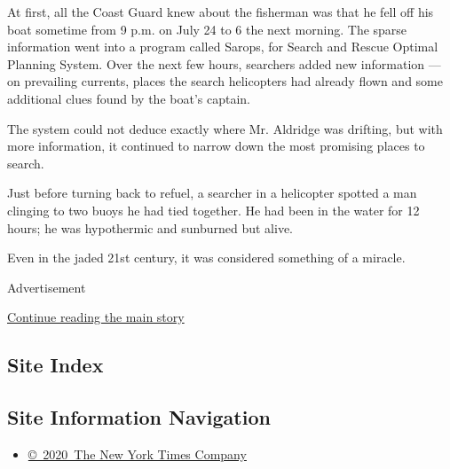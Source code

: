 At first, all the Coast Guard knew about the fisherman was that he fell
off his boat sometime from 9 p.m. on July 24 to 6 the next morning. The
sparse information went into a program called Sarops, for Search and
Rescue Optimal Planning System. Over the next few hours, searchers added
new information --- on prevailing currents, places the search
helicopters had already flown and some additional clues found by the
boat's captain.

The system could not deduce exactly where Mr. Aldridge was drifting, but
with more information, it continued to narrow down the most promising
places to search.

Just before turning back to refuel, a searcher in a helicopter spotted a
man clinging to two buoys he had tied together. He had been in the water
for 12 hours; he was hypothermic and sunburned but alive.

Even in the jaded 21st century, it was considered something of a
miracle.

Advertisement

\protect\hyperlink{after-bottom}{Continue reading the main story}

\hypertarget{site-index}{%
\subsection{Site Index}\label{site-index}}

\hypertarget{site-information-navigation}{%
\subsection{Site Information
Navigation}\label{site-information-navigation}}

\begin{itemize}
\tightlist
\item
  \href{https://help.nytimes3xbfgragh.onion/hc/en-us/articles/115014792127-Copyright-notice}{©~2020~The
  New York Times Company}
\end{itemize}

